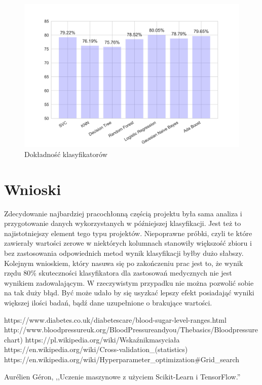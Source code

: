 \documentclass[12pt]{article}
\begin{document}
\begin{figure}[H]
	\centering
	\includegraphics[width=1.2\textwidth]{images/classificators_accuracy.jpg}
	\caption{Dokładność klasyfikatorów}
	\label{fig:accuracy}
\end{figure}

\section{Wnioski}
Zdecydowanie najbardziej pracochłonną częścią projektu była sama analiza i przygotowanie danych wykorzystanych w późniejszej klasyfikacji. Jest też to najistotniejszy element tego typu projektów. Niepoprawne próbki, czyli te które zawierały wartości zerowe w niektórych kolumnach stanowiły większość zbioru i bez zastosowania odpowiednich metod wynik klasyfikacji byłby dużo słabszy. Kolejnym wnioskiem, który nasuwa się po zakończeniu prac jest to, że wynik rzędu 80\% skuteczności klasyfikatora dla zastosowań medycznych nie jest wynikiem zadowalającym. W rzeczywistym przypadku nie można pozwolić sobie na tak duży błąd. Być może udało by się usyzkać lepszy efekt posiadająć wyniki większej ilości badań, bądź dane uzupełnione o brakujące wartości.



\newpage
\begin{thebibliography}{9}
	
	https://www.diabetes.co.uk/diabetescare/blood-sugar-level-ranges.html
	http://www.bloodpressureuk.org/BloodPressureandyou/Thebasics/Bloodpressurechart)
	https://pl.wikipedia.org/wiki/Wskaźnikmasyciała
	https://en.wikipedia.org/wiki/Cross-validation\_(statistics)
	https://en.wikipedia.org/wiki/Hyperparameter\_optimization\#Grid\_search
	    
	Aurélien Géron, ,,Uczenie maszynowe z użyciem Scikit-Learn i TensorFlow.''
	    
\end{thebibliography}
\end{document}
